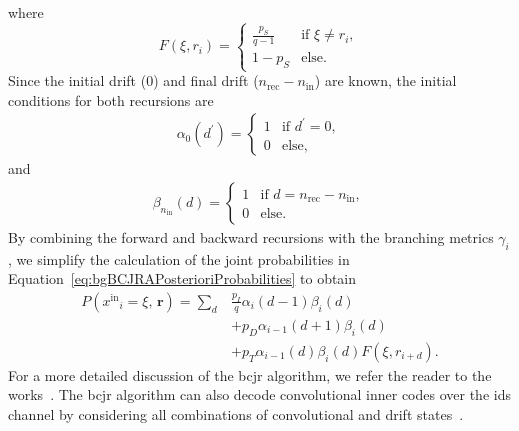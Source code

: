 \documentclass[conference,letterpaperu]{IEEEtran}
\newcommand{\cc}{\ensuremath{,\,}}
\newcommand{\pdel}{\ensuremath{p_D}}
\newcommand{\pins}{\ensuremath{p_I}}
\newcommand{\psub}{\ensuremath{p_S}}
\newcommand{\ptrans}{\ensuremath{p_T}}
\newcommand{\yinIx}{\ensuremath{x^{\text{in}}}}
\newcommand{\Yval}{\ensuremath{\xi}}
\newcommand{\nin}{\ensuremath{n_{\text{in}}}}
\newcommand{\rec}{\ensuremath{\bm{r}}}
\newcommand{\recIx}{\ensuremath{r}}
\newcommand{\nrec}{\ensuremath{n_{\text{rec}}}}
\newcommand{\dfrom}{\ensuremath{d}}
\newcommand{\dto}{\ensuremath{d^{\prime}}}
\begin{document}
where
$$
F(\Yval, \recIx_i) = 
\begin{cases}
    \frac{\psub}{q-1} & \text{if } \Yval \neq \recIx_{i} ,\\ 
    1 - \psub & \text{else.}
\end{cases}
$$
Since the initial drift ($0$) and final drift ($\nrec - \nin$) are known, the initial conditions for both recursions are 
\begin{align*}
    \alpha_0(\dto) = \begin{cases}
        1  & \text{if } \dto = 0, \\ 
        0 & \text{else,}
    \end{cases} 
\end{align*}
and 
\begin{align*}
    \beta_{\nin}(\dfrom)  = \begin{cases}
        1 & \text{if }\dfrom = \nrec - \nin, \\
        0 & \text{else.}
    \end{cases}
\end{align*}
By combining the forward and backward recursions with the branching metrics $\gamma_i$, we simplify the calculation of the joint probabilities in Equation~\eqref{eq:bgBCJRAPosterioriProbabilities} to obtain
\begin{align*}
    P(\yinIx_i = \Yval \cc \rec) = \sum_{\dfrom} &\frac{\pins}{q} \alpha_i(\dfrom-1)\beta_i(\dfrom) \\[-.7em]
    &+ \pdel \alpha_{i-1}(\dfrom + 1) \beta_i(\dfrom) \\ 
    &+ \ptrans \alpha_{i-1}(\dfrom)\beta_i(\dfrom) F(\Yval, \recIx_{i+\dfrom}).
\end{align*}
For a more detailed discussion of the \ac{bcjr} algorithm, we refer the reader to the works~\cite{bahlDecodingChannelsInsertions1975a, jelinekStatisticalMethodsSpeech1998}. The \ac{bcjr} algorithm can also decode convolutional inner codes over the \ac{ids} channel by considering all combinations of convolutional and drift states~\cite{maaroufConcatenatedCodesMultiple2023a}.
\end{document}
